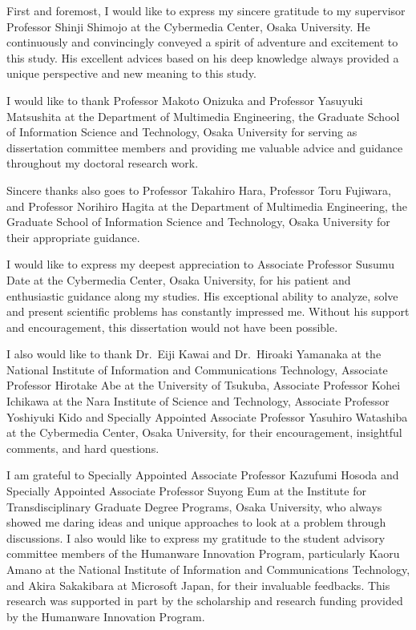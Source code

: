 
First and foremost, I would like to express my sincere gratitude to my
supervisor Professor Shinji Shimojo at the Cybermedia Center, Osaka
University. He continuously and convincingly conveyed a spirit of adventure
and excitement to this study. His excellent advices based on his deep
knowledge always provided a unique perspective and new meaning to this study.

I would like to thank Professor Makoto Onizuka and Professor Yasuyuki
Matsushita at the Department of Multimedia Engineering, the Graduate School of
Information Science and Technology, Osaka University for serving as
dissertation committee members and providing me valuable advice and guidance
throughout my doctoral research work.

Sincere thanks also goes to Professor Takahiro Hara, Professor Toru Fujiwara,
and Professor Norihiro Hagita at the Department of Multimedia Engineering,
the Graduate School of Information Science and Technology, Osaka University
for their appropriate guidance.

I would like to express my deepest appreciation to Associate Professor Susumu
Date at the Cybermedia Center, Osaka University, for his patient and
enthusiastic guidance along my studies. His exceptional ability to analyze,
solve and present scientific problems has constantly impressed me. Without his
support and encouragement, this dissertation would not have been possible.

I also would like to thank Dr.~Eiji Kawai and Dr.~Hiroaki Yamanaka at the
National Institute of Information and Communications Technology, Associate
Professor Hirotake Abe at the University of Tsukuba, Associate Professor Kohei
Ichikawa at the Nara Institute of Science and Technology, Associate Professor
Yoshiyuki Kido and Specially Appointed Associate Professor Yasuhiro Watashiba
at the Cybermedia Center, Osaka University, for their encouragement,
insightful comments, and hard questions.

I am grateful to Specially Appointed Associate Professor Kazufumi Hosoda and
Specially Appointed Associate Professor Suyong Eum at the Institute for
Transdisciplinary Graduate Degree Programs, Osaka University, who always
showed me daring ideas and unique approaches to look at a problem through
discussions. I also would like to express my gratitude to the student advisory
committee members of the Humanware Innovation Program, particularly Kaoru
Amano at the National Institute of Information and Communications Technology,
and Akira Sakakibara at Microsoft Japan, for their invaluable feedbacks. This
research was supported in part by the scholarship and research funding
provided by the Humanware Innovation Program.

